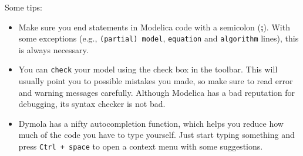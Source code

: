 \documentclass[10pt,a4paper]{article}
\begin{document}
Some tips:
\begin{itemize}
	\item Make sure you end statements in Modelica code with a semicolon 
	(\textbf{;}). With some exceptions (e.g., \texttt{(partial) model}, 
	\texttt{equation} and \texttt{algorithm} lines), this is always necessary.
	\item You can \texttt{check} your model using the check box in the toolbar. 
	This will usually point you to possible mistakes you made, so make sure to 
	read error and warning messages carefully. Although Modelica has a bad 
	reputation for debugging, its syntax checker is not bad.
	\item Dymola has a nifty autocompletion function, which helps you reduce 
	how much of the code you have to type yourself. Just start typing something 
	and press \texttt{Ctrl + space} to open a context menu with some 
	suggestions.
\end{itemize}
\end{document}
